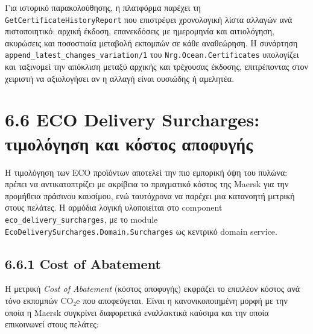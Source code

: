 Για ιστορικό παρακολούθησης, η πλατφόρμα παρέχει τη
\texttt{GetCertificateHistoryReport} που επιστρέφει χρονολογική λίστα
αλλαγών ανά πιστοποιητικό: αρχική έκδοση, επανεκδόσεις με ημερομηνία και
αιτιολόγηση, ακυρώσεις και ποσοστιαία μεταβολή εκπομπών σε κάθε
αναθεώρηση. Η συνάρτηση \texttt{append\_latest\_changes\_variation/1}
του \texttt{Nrg.Ocean.Certificates} υπολογίζει και ταξινομεί την
απόκλιση μεταξύ αρχικής και τρέχουσας έκδοσης, επιτρέποντας στον
χειριστή να αξιολογήσει αν η αλλαγή είναι ουσιώδης ή αμελητέα.

\section{6.6 ECO Delivery Surcharges: τιμολόγηση και κόστος
αποφυγής}\label{eco-delivery-surcharges-ux3c4ux3b9ux3bcux3bfux3bbux3ccux3b3ux3b7ux3c3ux3b7-ux3baux3b1ux3b9-ux3baux3ccux3c3ux3c4ux3bfux3c2-ux3b1ux3c0ux3bfux3c6ux3c5ux3b3ux3aeux3c2}

Η τιμολόγηση των ECO προϊόντων αποτελεί την πιο εμπορική όψη του πυλώνα:
πρέπει να αντικατοπτρίζει με ακρίβεια το πραγματικό κόστος της Maersk
για την προμήθεια πράσινου καυσίμου, ενώ ταυτόχρονα να παρέχει μια
κατανοητή μετρική στους πελάτες. Η αρμόδια λογική υλοποιείται στο
component \texttt{eco\_delivery\_surcharges}, με το module
\texttt{EcoDeliverySurcharges.Domain.Surcharges} ως κεντρικό domain
service.

\subsection{6.6.1 Cost of Abatement}\label{cost-of-abatement}

Η μετρική \emph{Cost of Abatement} (κόστος αποφυγής) εκφράζει το
επιπλέον κόστος ανά τόνο εκπομπών CO₂e που αποφεύγεται. Είναι η
κανονικοποιημένη μορφή με την οποία η Maersk συγκρίνει διαφορετικά
εναλλακτικά καύσιμα και την οποία επικοινωνεί στους πελάτες:

\begin{Shaded}
\begin{Highlighting}[]
\FunctionTok{(}\NormalTok{\%}\FunctionTok{\{}
    \FunctionTok{\})} 
  \FunctionTok{(}
    \FunctionTok{(}\FunctionTok{)}\NormalTok{,}
    \FunctionTok{(}\FunctionTok{(}\FunctionTok{))}
  \FunctionTok{)}
\end{Highlighting}
\end{Shaded}

